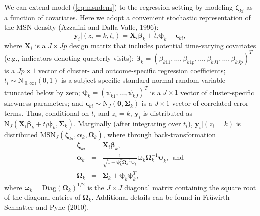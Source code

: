 \documentclass[useAMS,referee]{biom}
\begin{document}
We can extend model (\ref{eq:msndens}) to the regression setting by modeling $\boldsymbol\zeta_{ki}$ as a function of covariates. Here we adopt a convenient stochastic representation of the MSN density (Azzalini and Dalla Valle, 1996):
\begin{equation}
\mathbf{y}_{i}|(z_i=k,t_i) = \mathbf{X}_i \boldsymbol\beta_k + t_i \boldsymbol\psi_k + \boldsymbol\epsilon_{ki}, \label{eq:msnreg}
\end{equation}
where 
$\mathbf{X}_i$ is a $J \times Jp$ design matrix that includes potential time-varying covariates (e.g., indicators denoting quarterly visits); $\boldsymbol{\beta}_k=(\beta_{k11},\ldots,\beta_{k1p},\ldots,\beta_{kJ1},\ldots,\beta_{kJp})^T$ is a $Jp\times 1$ vector of cluster- and outcome-specific regression coefficients; $t_i\sim \text{N}_{[0,\infty)}(0,1)$ is a subject-specific standard normal random variable truncated below by zero; $\boldsymbol\psi_k=(\psi_{k1},\ldots,\psi_{kJ})^T$ is a $J \times 1$ vector of cluster-specific skewness parameters; and $\boldsymbol{\epsilon}_{ki} \sim \text{N}_J(\boldsymbol0,\boldsymbol\Sigma_k)$ is a $J\times 1$ vector of correlated error terms. Thus, conditional on $t_i$ and $z_i=k$, $\boldsymbol{y}_i$ is distributed as $\text{N}_J(\mathbf{X}_i \boldsymbol\beta_k + t_i \boldsymbol\psi_k, \boldsymbol{\Sigma}_k)$. Marginally (after integrating over $t_i$), $\mathbf{y}_i|(z_i = k)$ is distributed $\text{MSN}_J(\boldsymbol\zeta_{ki}, \boldsymbol\alpha_k, \boldsymbol\Omega_k)$, where through back-transformation 
\begin{eqnarray}
\boldsymbol\zeta_{ki} &=& \mathbf{X}_i\boldsymbol\beta_k, \nonumber \\
\boldsymbol\alpha_k &=& \frac{1}{\sqrt{1 - \boldsymbol\psi_k^T 
\boldsymbol\Omega^{-1}_k\boldsymbol\psi_k}} \boldsymbol\omega_k \boldsymbol\Omega^{-1}_k\boldsymbol\psi_k,~~\text{and} \label{eqn:back_transform}\\
\boldsymbol\Omega_k &=& \boldsymbol\Sigma_k  + \boldsymbol\psi_k \boldsymbol\psi_k^T \nonumber,
\end{eqnarray}
where $\boldsymbol\omega_k = \text{Diag}(\boldsymbol\Omega_k)^{1/2}$ is the $J \times J$ diagonal matrix containing the square root of the diagonal entries of $\boldsymbol\Omega_k$. Additional details can be found in Fr\"{u}wirth-Schnatter and Pyne (2010). 
\end{document}
